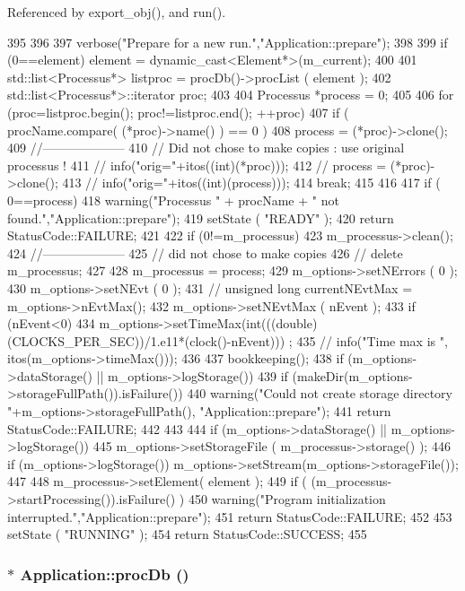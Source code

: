 Referenced by export\_\-obj(), and run().


\begin{DoxyCode}
395                                                {
396 
397   verbose("Prepare for a new run.","Application::prepare");
398 
399   if (0==element) element = dynamic_cast<Element*>(m_current);
400 
401   std::list<Processus*> listproc = procDb()->procList ( element );
402   std::list<Processus*>::iterator proc;
403 
404   Processus *process = 0;
405 
406   for (proc=listproc.begin(); proc!=listproc.end(); ++proc) {
407     if ( procName.compare( (*proc)->name() ) == 0 ) {
408       process = (*proc)->clone();
409       //--------------------
410       // Did not chose to make copies : use original processus !
411       //      info("orig="+itos((int)(*proc)));
412       //      process = (*proc)->clone();
413       //      info("orig="+itos((int)(process)));
414       break;
415     }
416   }
417   if ( 0==process) {
418     warning("Processus " + procName + " not found.","Application::prepare");
419     setState ( "READY" );
420     return StatusCode::FAILURE;
421   }
422   if (0!=m_processus) {
423     m_processus->clean();
424     //--------------------
425     // did not chose to make copies
426     //    delete m_processus;
427   }
428   m_processus = process;
429   m_options->setNErrors ( 0 );
430   m_options->setNEvt ( 0 );
431   //  unsigned long currentNEvtMax  = m_options->nEvtMax();
432   m_options->setNEvtMax ( nEvent );
433   if (nEvent<0) {
434     m_options->setTimeMax(int(((double)(CLOCKS_PER_SEC))/1.e11*(clock()-nEvent)))
      ;
435     //    info("Time max is ", itos(m_options->timeMax()));
436   }
437   bookkeeping();
438   if (m_options->dataStorage() || m_options->logStorage()) {
439     if (makeDir(m_options->storageFullPath()).isFailure()) {
440       warning("Could not create storage directory "+m_options->storageFullPath(),
      "Application::prepare");
441       return StatusCode::FAILURE;
442     }
443   }
444   if (m_options->dataStorage() || m_options->logStorage()) {
445     m_options->setStorageFile ( m_processus->storage() );
446     if (m_options->logStorage()) {m_options->setStream(m_options->storageFile());
       }
447   }
448   m_processus->setElement( element );
449   if ( (m_processus->startProcessing()).isFailure() ) {
450     warning("Program initialization interrupted.","Application::prepare");
451     return StatusCode::FAILURE;
452   }
453   setState ( "RUNNING" );
454   return StatusCode::SUCCESS;
455 }
\end{DoxyCode}
\hypertarget{classApplication_aa5c28af1a7e1c41dada2db2a4d03c57d}{
\subsubsection[{procDb}]{$\ast$ Application::procDb ()}}
